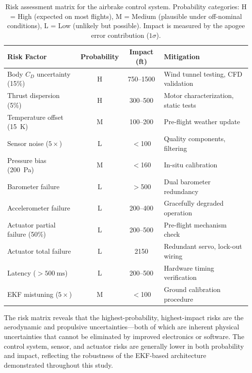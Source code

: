 \documentclass[11pt,letterpaper]{article}
\newcommand{\Cd}{C_D}
\begin{document}
\begin{table}[H]
    \centering
    \caption{Risk assessment matrix for the airbrake control system. Probability categories: H = High (expected on most flights), M = Medium (plausible under off-nominal conditions), L = Low (unlikely but possible). Impact is measured by the apogee error contribution ($1\sigma$).}
    \label{tab:risk_matrix}
    \begin{tabular}{p{4.5cm}ccp{5cm}}
        \toprule
        \textbf{Risk Factor} & \textbf{Probability} & \textbf{Impact (ft)} & \textbf{Mitigation} \\
        \midrule
        Body $\Cd$ uncertainty (15\%) & H & 750--1500 & Wind tunnel testing, CFD validation \\
        Thrust dispersion (5\%) & H & 300--500 & Motor characterization, static tests \\
        Temperature offset (\SI{15}{\kelvin}) & M & 100--200 & Pre-flight weather update \\
        Sensor noise ($5\times$) & L & $<$100 & Quality components, filtering \\
        Pressure bias (\SI{200}{\pascal}) & M & $<$160 & In-situ calibration \\
        Barometer failure & L & $>$500 & Dual barometer redundancy \\
        Accelerometer failure & L & 200--400 & Gracefully degraded operation \\
        Actuator partial failure (50\%) & L & 200--500 & Pre-flight mechanism check \\
        Actuator total failure & L & 2150 & Redundant servo, lock-out wiring \\
        Latency ($>\SI{500}{\milli\second}$) & L & 200--500 & Hardware timing verification \\
        EKF mistuning ($5\times$) & M & $<$100 & Ground calibration procedure \\
        \bottomrule
    \end{tabular}
\end{table}

The risk matrix reveals that the highest-probability, highest-impact risks are the aerodynamic and propulsive uncertainties---both of which are inherent physical uncertainties that cannot be eliminated by improved electronics or software. The control system, sensor, and actuator risks are generally lower in both probability and impact, reflecting the robustness of the EKF-based architecture demonstrated throughout this study.
\end{document}

